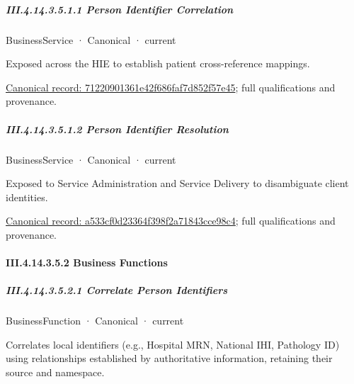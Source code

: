 \subparagraph*{III.4.14.3.5.1.1 Person Identifier Correlation}
\label{navigation:III.4.14.3.5.1.1}

\label{element:71220901361e42f686faf7d852f57e45}
{\small BusinessService · Canonical · current}\par

Exposed across the HIE to establish patient cross-reference mappings.


{\footnotesize \href{../../../../../../../continuum/business/business-service/71220901361e42f686faf7d852f57e45.md}{Canonical record: 71220901361e42f686faf7d852f57e45}; full qualifications and provenance.}\par
\subparagraph*{III.4.14.3.5.1.2 Person Identifier Resolution}
\label{navigation:III.4.14.3.5.1.2}

\label{element:a533cf0d23364f398f2a71843cce98c4}
{\small BusinessService · Canonical · current}\par

Exposed to Service Administration and Service Delivery to disambiguate client identities.


{\footnotesize \href{../../../../../../../continuum/business/business-service/a533cf0d23364f398f2a71843cce98c4.md}{Canonical record: a533cf0d23364f398f2a71843cce98c4}; full qualifications and provenance.}\par
\paragraph*{III.4.14.3.5.2 Business Functions}
\label{navigation:III.4.14.3.5.2}

\subparagraph*{III.4.14.3.5.2.1 Correlate Person Identifiers}
\label{navigation:III.4.14.3.5.2.1}

\label{element:3050366e2e1d47eeaa4cfd6db92c0a56}
{\small BusinessFunction · Canonical · current}\par

Correlates local identifiers (e.g., Hospital MRN, National IHI, Pathology ID) using relationships established by authoritative information, retaining their source and namespace.


